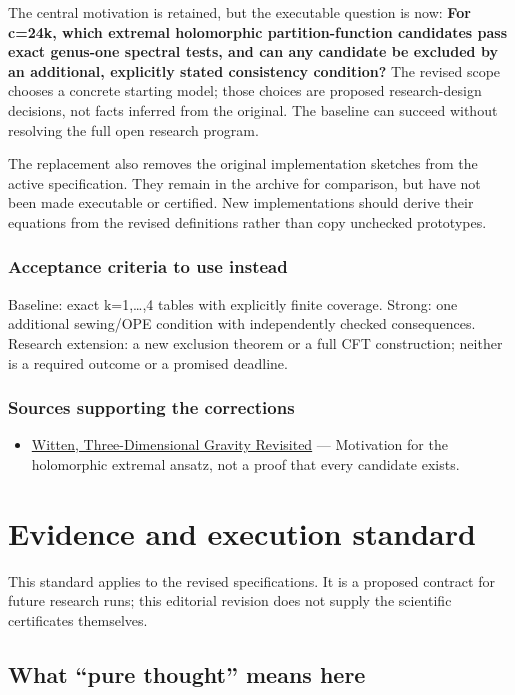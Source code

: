 \documentclass[
  11pt,
]{article}
\providecommand{\tightlist}{%
  \setlength{\itemsep}{0pt}\setlength{\parskip}{0pt}}
\begin{document}
The central motivation is retained, but the executable question is now:
\textbf{For c=24k, which extremal holomorphic partition-function
candidates pass exact genus-one spectral tests, and can any candidate be
excluded by an additional, explicitly stated consistency condition?} The
revised scope chooses a concrete starting model; those choices are
proposed research-design decisions, not facts inferred from the
original. The baseline can succeed without resolving the full open
research program.

The replacement also removes the original implementation sketches from
the active specification. They remain in the archive for comparison, but
have not been made executable or certified. New implementations should
derive their equations from the revised definitions rather than copy
unchecked prototypes.

\subsubsection{Acceptance criteria to use instead}

Baseline: exact k=1,\ldots,4 tables with explicitly finite coverage.
Strong: one additional sewing/OPE condition with independently checked
consequences. Research extension: a new exclusion theorem or a full CFT
construction; neither is a required outcome or a promised deadline.

\subsubsection{Sources supporting the corrections}

\begin{itemize}
\tightlist
\item
  \href{https://arxiv.org/abs/0706.3359}{Witten, Three-Dimensional
  Gravity Revisited} --- Motivation for the holomorphic extremal ansatz,
  not a proof that every candidate exists.
\end{itemize}

\section{Evidence and execution standard}

This standard applies to the revised specifications. It is a proposed
contract for future research runs; this editorial revision does not
supply the scientific certificates themselves.

\subsection{What ``pure thought'' means here}
\end{document}
